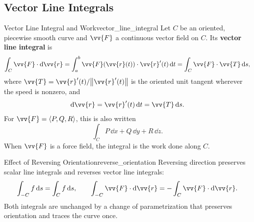 \subsection{Vector Line Integrals}
\begin{definition}{Vector Line Integral and Work}{vector_line_integral}
Let $C$ be an oriented, piecewise smooth curve and $\vv{F}$ a continuous vector field on $C$. Its \textbf{vector line integral} is
\[
    \int_C \vv{F}\cdot\dd{\vv{r}}
    = \int_a^b \vv{F}(\vv{r}(t))\cdot\vv{r}'(t)\,\dd{t}
    = \int_C \vv{F}\cdot\vv{T}\,\dd{s},
\]
where $\vv{T} = \vv{r}'(t)/\norm{\vv{r}'(t)}$ is the oriented unit tangent wherever the speed is nonzero, and
\[
    \dd{\vv{r}} = \vv{r}'(t)\,\dd{t} = \vv{T}\,\dd{s}.
\]
For $\vv{F} = \ang{P,Q,R}$, this is also written
\[
    \int_C P\,\dd{x} + Q\,\dd{y} + R\,\dd{z}.
\]
When $\vv{F}$ is a force field, the integral is the work done along $C$.
\end{definition}

\begin{theorem}{Effect of Reversing Orientation}{reverse_orientation}
Reversing direction preserves scalar line integrals and reverses vector line integrals:
\[
    \int_{-C} f\,\dd{s} = \int_C f\,\dd{s},\qquad
    \int_{-C}\vv{F}\cdot\dd{\vv{r}}
    = -\int_C\vv{F}\cdot\dd{\vv{r}}.
\]
Both integrals are unchanged by a change of parametrization that preserves orientation and traces the curve once.
\end{theorem}

